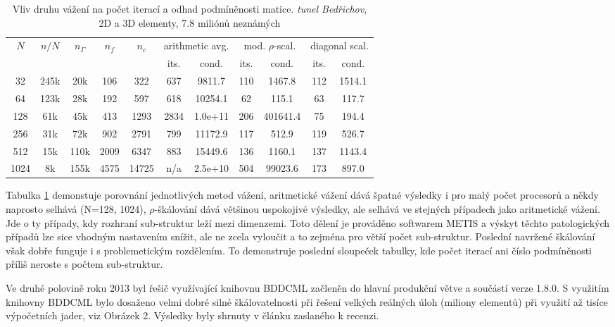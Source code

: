 \documentclass[11pt]{report}
\begin{document}
\begin{table}[H]
\begin{center}
\begin{tabular}
[c]{|cc|ccc|cc|cc|cc|}\hline
\multirow{2}{*}{$N$} & \multirow{2}{*}{$n/N$} &
\multirow{2}{*}{$n_{\Gamma}$} & \multirow{2}{*}{$n_f$} &
\multirow{2}{*}{$n_c$} & \multicolumn{2}{c|}{arithmetic avg.} &
\multicolumn{2}{c|}{mod. $\rho$-scal.} & \multicolumn{2}{c|}{diagonal scal.}\\
&  &  &  &  & its. & cond. & its. & cond. & its. & cond.\\\hline
32 & 245k & 20k & 106 & 322 & 637 & 9811.7 & 110 & 1467.8 & 112 & 1514.1\\
64 & 123k & 28k & 192 & 597 & 618 & 10254.1 & 62 & 115.1 & 63 & 117.7\\
128 & 61k & 45k & 413 & 1293 & 2834 & 1.0e+11 & 206 & 401641.4 & 75 & 194.4\\
256 & 31k & 72k & 902 & 2791 & 799 & 11172.9 & 117 & 512.9 & 119 & 526.7\\
512 & 15k & 110k & 2009 & 6347 & 883 & 15449.6 & 136 & 1160.1 & 137 & 1143.4\\
1024 & 8k & 155k & 4575 & 14725 & n/a & 2.5e+10 & 504 & 99023.6 & 173 &
897.0\\\hline
\end{tabular}
\end{center}
\caption{\label{tab:tunnel_averaging}
Vliv druhu vážení na počet iterací a odhad podmíněnosti matice.
\emph{tunel Bed\v{r}ichov}, 2D a 3D elementy, 7.8 miliónů neznámých}
\end{table}


Tabulka \ref{tab:tunnel_averaging} demonstuje porovnání 
jednotlivých metod vážení, aritmetické vážení dává špatné výsledky i pro malý 
počet procesorů a někdy naprosto selhává (N=128, 1024), $\rho$-škálování dává 
většinou uspokojivé výsledky, ale selhává ve stejných případech jako aritmetické 
vážení. Jde o ty případy, kdy rozhraní sub-struktur leží 
mezi dimenzemi. Toto dělení je prováděno softwarem METIS a výskyt těchto 
patologických případů lze sice vhodným nastavením snížit, ale ne zcela vyloučit 
a to zejména pro větší počet sub-struktur. Poslední navržené škálování  však 
dobře funguje i s problemetickým rozdělením. To demonstruje poslední sloupeček 
tabulky, kde
počet iterací ani číslo podmíněnosti příliš neroste s počtem sub-struktur.


Ve druhé polovině roku 2013 byl řešič využívající knihovnu BDDCML začleněn do 
hlavní produkční větve a součástí verze 1.8.0. S využitím knihovny BDDCML bylo 
dosaženo velmi dobré silné škálovatelnosti při řešení velkých reálných úloh 
(miliony elementů) při využití až tisíce výpočetních jader, viz Obrázek 2. 
Výsledky byly shrnuty v článku \cite{SistekBDDC} zaslaného k recenzi.
\end{document}
